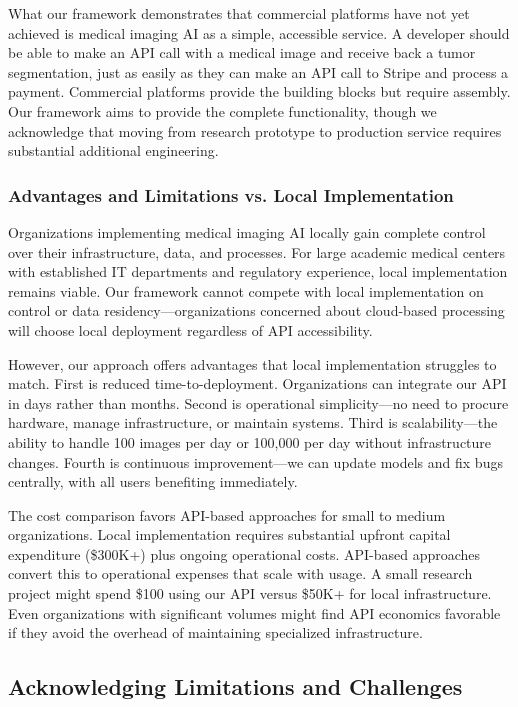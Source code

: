 \documentclass[12pt,a4paper]{article}
\begin{document}
What our framework demonstrates that commercial platforms have not yet achieved is medical imaging AI as a simple, accessible service. A developer should be able to make an API call with a medical image and receive back a tumor segmentation, just as easily as they can make an API call to Stripe and process a payment. Commercial platforms provide the building blocks but require assembly. Our framework aims to provide the complete functionality, though we acknowledge that moving from research prototype to production service requires substantial additional engineering.

\subsubsection{Advantages and Limitations vs. Local Implementation}

Organizations implementing medical imaging AI locally gain complete control over their infrastructure, data, and processes. For large academic medical centers with established IT departments and regulatory experience, local implementation remains viable. Our framework cannot compete with local implementation on control or data residency—organizations concerned about cloud-based processing will choose local deployment regardless of API accessibility.

However, our approach offers advantages that local implementation struggles to match. First is reduced time-to-deployment. Organizations can integrate our API in days rather than months. Second is operational simplicity—no need to procure hardware, manage infrastructure, or maintain systems. Third is scalability—the ability to handle 100 images per day or 100,000 per day without infrastructure changes. Fourth is continuous improvement—we can update models and fix bugs centrally, with all users benefiting immediately.

The cost comparison favors API-based approaches for small to medium organizations. Local implementation requires substantial upfront capital expenditure (\$300K+) plus ongoing operational costs. API-based approaches convert this to operational expenses that scale with usage. A small research project might spend \$100 using our API versus \$50K+ for local infrastructure. Even organizations with significant volumes might find API economics favorable if they avoid the overhead of maintaining specialized infrastructure.

\subsection{Acknowledging Limitations and Challenges}
\end{document}
